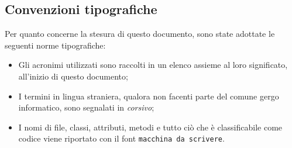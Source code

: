 \subsection{Convenzioni tipografiche}
Per quanto concerne la stesura di questo documento, sono state adottate le seguenti norme tipografiche:
\begin{itemize}
    \item Gli acronimi utilizzati sono raccolti in un elenco assieme al loro significato, all'inizio di questo documento;
    \item I termini in lingua straniera, qualora non facenti parte del comune gergo informatico, sono segnalati in \textit{corsivo};
    \item I nomi di file, classi, attributi, metodi e tutto ciò che è classificabile come codice viene riportato con il font \texttt{macchina da scrivere}.
\end{itemize}